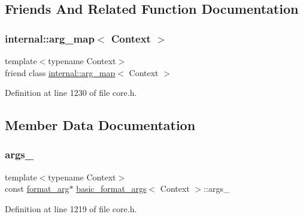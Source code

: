 \subsection{Friends And Related Function Documentation}
\mbox{\label{classbasic__format__args_a7974100f026be256213827458684be38}} 
\subsubsection{\texorpdfstring{internal\+::arg\+\_\+map$<$ Context $>$}{internal::arg\_map< Context >}}
{\footnotesize\ttfamily template$<$typename Context$>$ \\
friend class \hyperlink{classinternal_1_1arg__map}{internal\+::arg\+\_\+map}$<$ Context $>$\hspace{0.3cm}{\ttfamily [friend]}}



Definition at line 1230 of file core.\+h.



\subsection{Member Data Documentation}
\mbox{\label{classbasic__format__args_a10f1ae5ac5a30339225e090f0bef62c1}} 
\subsubsection{\texorpdfstring{args\+\_\+}{args\_}}
{\footnotesize\ttfamily template$<$typename Context$>$ \\
const \hyperlink{classbasic__format__args_aa8e7659bf8a41ef7cf889bd3edcbc129}{format\+\_\+arg}$\ast$ \hyperlink{classbasic__format__args}{basic\+\_\+format\+\_\+args}$<$ Context $>$\+::args\+\_\+}



Definition at line 1219 of file core.\+h.

\mbox{\label{classbasic__format__args_a5150e3a6c8ef4f2646c64f589f6bfae9}} 
